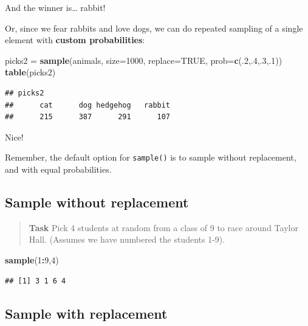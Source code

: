 \documentclass[
]{book}
\newenvironment{Shaded}{\begin{snugshade}}{\end{snugshade}}
\newcommand{\AttributeTok}[1]{\textcolor[rgb]{0.13,0.29,0.53}{#1}}
\newcommand{\ConstantTok}[1]{\textcolor[rgb]{0.56,0.35,0.01}{#1}}
\newcommand{\DecValTok}[1]{\textcolor[rgb]{0.00,0.00,0.81}{#1}}
\newcommand{\FunctionTok}[1]{\textcolor[rgb]{0.13,0.29,0.53}{\textbf{#1}}}
\newcommand{\NormalTok}[1]{#1}
\newcommand{\OtherTok}[1]{\textcolor[rgb]{0.56,0.35,0.01}{#1}}
\newcommand{\SpecialCharTok}[1]{\textcolor[rgb]{0.81,0.36,0.00}{\textbf{#1}}}
\theoremstyle{definition}
\theoremstyle{definition}
\theoremstyle{definition}
\theoremstyle{definition}
\theoremstyle{remark}
\begin{document}
And the winner is\ldots{} rabbit!

Or, since we fear rabbits and love dogs, we can do repeated sampling of a single element with \textbf{custom probabilities}:

\begin{Shaded}
\begin{Highlighting}[]
\NormalTok{picks2 }\OtherTok{=} \FunctionTok{sample}\NormalTok{(animals,}
                \AttributeTok{size=}\DecValTok{1000}\NormalTok{,}
                \AttributeTok{replace=}\ConstantTok{TRUE}\NormalTok{,}
                \AttributeTok{prob=}\FunctionTok{c}\NormalTok{(.}\DecValTok{2}\NormalTok{,.}\DecValTok{4}\NormalTok{,.}\DecValTok{3}\NormalTok{,.}\DecValTok{1}\NormalTok{))}
\FunctionTok{table}\NormalTok{(picks2)}
\end{Highlighting}
\end{Shaded}

\begin{verbatim}
## picks2
##      cat      dog hedgehog   rabbit 
##      215      387      291      107
\end{verbatim}

Nice!

Remember, the default option for \texttt{sample()} is to sample without replacement, and with equal probabilities.

\subsection{Sample without replacement}\label{sample-without-replacement}

\begin{quote}
\textbf{Task}
Pick 4 students at random from a class of 9 to race around Taylor Hall. (Assumes we have numbered the students 1-9).
\end{quote}

\begin{Shaded}
\begin{Highlighting}[]
\FunctionTok{sample}\NormalTok{(}\DecValTok{1}\SpecialCharTok{:}\DecValTok{9}\NormalTok{,}\DecValTok{4}\NormalTok{)}
\end{Highlighting}
\end{Shaded}

\begin{verbatim}
## [1] 3 1 6 4
\end{verbatim}

\subsection{Sample with replacement}\label{sample-with-replacement}
\end{document}
